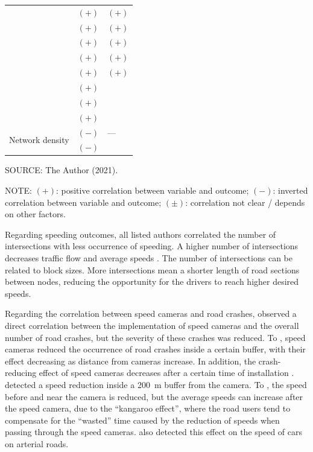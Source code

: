 \begin{table}[!hbtp]
\begin{tabular}{p{2.5cm}p{6.2cm}p{6.2cm}}
         & $(+)$ \textcite{Dumbaugh2011} & $(+)$ \textcite{Dumbaugh2013} \\
         & $(+)$ \textcite{Dumbaugh2013} & $(+)$ \textcite{Ewing2009} \\
         & $(+)$ \textcite{Ewing2009} & $(+)$ \textcite{Huang2018} \\
         & $(+)$ \textcite{Huang2018} & $(+)$ \textcite{Obelheiro2020} \\
         & $(+)$ \textcite{Obelheiro2020} & $(+)$ \textcite{Welle2016} \\
         & $(+)$ \textcite{Ukkusuri2012} &  \\
         & $(+)$ \textcite{Welle2016} &  \\
         & $(+)$ \textcite{Yu2017} &  \\ \hline
        \multirow{2}{2cm}{Network density} & $(-)$ \textcite{Marshall2010} & --- \\
         & $(-)$ \textcite{Marshall2011} &  \\ \hline
        \end{tabular}
    \label{tab:design}
    \par \vspace{1mm} \footnotesize \raggedright
    SOURCE: The Author (2021).
    \par \vspace{1mm} \footnotesize \raggedright
    NOTE: $(+)$: positive correlation between variable and outcome; $(-)$: inverted correlation between variable and outcome; $(\pm)$: correlation not clear / depends on other factors.
\end{table}

Regarding speeding outcomes, all listed authors correlated the number of intersections with less occurrence of speeding. A higher number of intersections decreases traffic flow and average speeds \cite{Elvik2009,Ewing2009}. The number of intersections can be related to block sizes. More intersections mean a shorter length of road sections between nodes, reducing the opportunity for the drivers to reach higher desired speeds.

Regarding the correlation between speed cameras and road crashes, \textcite{Park2019} observed a direct correlation between the implementation of speed cameras and the overall number of road crashes, but the severity of these crashes was reduced. To \textcite{Høye2015,Li2013a}, speed cameras reduced the occurrence of road crashes inside a certain buffer, with their effect decreasing as distance from cameras increase. In addition, the crash-reducing effect of speed cameras decreases after a certain time of installation \cite{Li2020}. \textcite{Li2013a,Oliveira2015} detected a speed reduction inside a 200 m buffer from the camera. To \textcite{Li2020}, the speed before and near the camera is reduced, but the average speeds can increase after the speed camera, due to the ``kangaroo effect'', where the road users tend to compensate for the ``wasted'' time caused by the reduction of speeds when passing through the speed cameras. \textcite{Amancio2021} also detected this effect on the speed of cars on arterial roads. 

